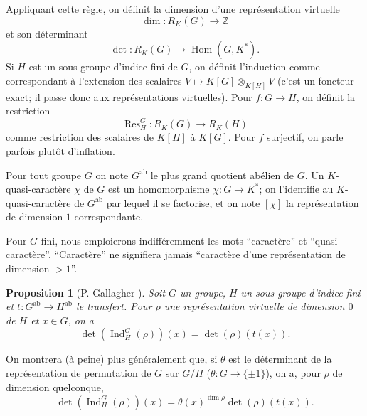 \documentclass[11pt,a4paper]{amsart}
\theoremstyle{plain}
\newtheorem{proposition}[theorem]{Proposition}
\theoremstyle{definition}
\DeclareMathOperator{\Ind}{Ind}
\DeclareMathOperator{\Res}{Res}
\DeclareMathOperator{\Hom}{Hom}
\newcommand{\dbZ}{\mathbb{Z}}
\newcommand{\ab}{\mathrm{ab}}
\def\dim{\mathop{\mathrm{dim}}\nolimits}
\newenvironment{para}{\par\noindent}{\par}
\begin{document}
\begin{para}
Appliquant cette r\`egle, on d\'efinit la dimension d'une repr\'esentation virtuelle
\[
\dim: R_{K}(G) \longrightarrow \dbZ
\]
et son d\'eterminant
\[
\det: R_{K}(G) \longrightarrow \Hom(G, K^{*}).
\]
Si $H$ est un sous-groupe d'indice fini de $G$, on d\'efinit l'induction comme correspondant \`a l'extension des scalaires $V \mapsto K[G] \otimes_{K[H]} V$ (c'est un foncteur exact; il passe donc aux repr\'esentations virtuelles). Pour $f: G \to H$, on d\'efinit la restriction
\[
\Res^{G}_{H}: R_{K}(G) \longrightarrow R_{K}(H)
\]
comme restriction des scalaires de $K[H]$ \`a $K[G]$. Pour $f$ surjectif, on parle parfois plut\^ot d'inflation.
\end{para}

\begin{para}
Pour tout groupe $G$ on note $G^{\ab}$ le plus grand quotient ab\'elien de $G$. Un $K$-quasi-caract\`ere $\chi$ de $G$ est un homomorphisme $\chi: G \to K^{*}$; on l'identifie au $K$-quasi-caract\`ere de $G^{\ab}$ par lequel il se factorise, et on note $[\chi]$ la repr\'esentation de dimension $1$ correspondante.
\end{para}

\begin{para}
Pour $G$ fini, nous emploierons indiff\'eremment les mots ``caract\`ere'' et ``quasi-caract\`ere''. ``Caract\`ere'' ne signifiera jamais ``caract\`ere d'une repr\'esentation de dimension $> 1$''.
\end{para}

\begin{proposition}[P. Gallagher \cite{20}]
\label{prop1.2}
Soit $G$ un groupe, $H$ un sous-groupe d'indice fini et $t: G^{\ab} \to H^{\ab}$ le transfert. Pour $\rho$ une repr\'esentation virtuelle de dimension $0$ de $H$ et $x \in G$, on a
\[
\det(\Ind^{G}_{H}(\rho))(x) = \det(\rho)(t(x)).
\]
\end{proposition}

On montrera (\`a peine) plus g\'en\'eralement que, si $\theta$ est le d\'eterminant de la repr\'esentation de permutation de $G$ sur $G/H$ ($\theta: G \to \{\pm 1\}$), on a, pour $\rho$ de dimension quelconque,
\begin{equation}\label{eq1.2}
\det(\Ind^{G}_{H}(\rho))(x) = \theta(x)^{\dim \rho} \det(\rho)(t(x)).
\end{equation}
\end{document}
